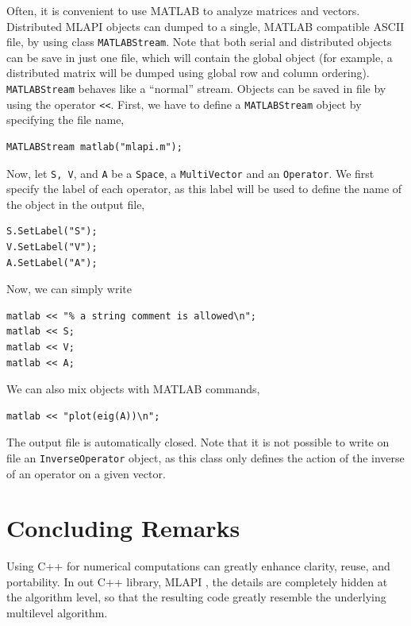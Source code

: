 \documentclass{article}[11pt]
\newcommand{\MLAPI}  {{\sc MLAPI }}
\begin{document}
Often, it is convenient to use MATLAB to analyze matrices and
vectors. Distributed \MLAPI objects can dumped to a single, MATLAB compatible
ASCII file, by using class {\tt MATLABStream}.
Note that both serial and distributed objects 
can be save in just one file, which will contain the global object
(for example, a distributed matrix will be dumped using global row and
 column ordering). {\tt MATLABStream} behaves like a ``normal'' 
stream.  Objects can be saved in file by using the operator \verb!<<!.
First, we have to define a {\tt MATLABStream} object by specifying the
file name,
\begin{verbatim}
MATLABStream matlab("mlapi.m");
\end{verbatim}
Now, let {\tt S, V}, and {\tt A} be a {\tt Space}, a {\tt MultiVector}
and an {\tt Operator}. We first specify the label of each operator, as this
label will be used to define the name of the object in the output file,
\begin{verbatim}
S.SetLabel("S");
V.SetLabel("V");
A.SetLabel("A");
\end{verbatim}
Now, we can simply write
\begin{verbatim}
matlab << "% a string comment is allowed\n";
matlab << S;
matlab << V;
matlab << A;
\end{verbatim}
We can also mix objects with MATLAB commands,
\begin{verbatim}
matlab << "plot(eig(A))\n";
\end{verbatim}
The output file is automatically closed. Note that it is not possible to write
on file an {\tt InverseOperator} object, as this class only defines the
action of the inverse of an operator on a given vector.

\section{Concluding Remarks}
\label{sec:conclusion}

Using C++ for numerical computations can greatly enhance clarity, reuse, and
portability. In out C++  library, \MLAPI, the details are completely hidden at
the algorithm level, so that the resulting code greatly resemble the 
underlying multilevel algorithm.

\smallskip
\end{document}
